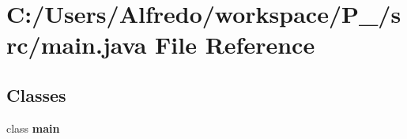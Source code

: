 \section{C\+:/\+Users/\+Alfredo/workspace/\+P\+\_/src/main.java File Reference}
\label{main_8java}
\subsection*{Classes}
\begin{DoxyCompactItemize}
\item 
class {\bf main}
\end{DoxyCompactItemize}
